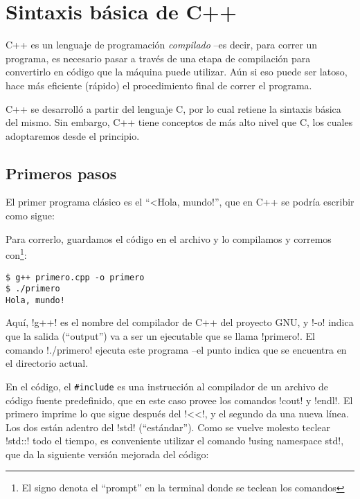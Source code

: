 \chapter{Sintaxis básica de C++}


C++ es un lenguaje de programación \emph{compilado} --es decir, para correr un
programa, es necesario pasar a través de una etapa de compilación para
convertirlo en código que la máquina puede utilizar. Aún si eso puede ser
latoso, hace más eficiente (rápido) el procedimiento final de correr el
programa. 

C++ se desarrolló a partir del lenguaje C, por lo cual retiene la sintaxis
básica del mismo. Sin embargo, C++ tiene conceptos de más alto nivel que C, 
los cuales
adoptaremos  desde el principio.

% 

\section{Primeros pasos}
El primer programa clásico es el ``<Hola, mundo!'', que en C++ se podría
escribir como sigue:

Para correrlo, guardamos el código en el archivo  y lo
compilamos y corremos con\footnote{El signo \inl{\$} denota el ``prompt''
en la terminal donde se teclean los comandos}:
\begin{lstlisting}
$ g++ primero.cpp -o primero
$ ./primero
Hola, mundo!
\end{lstlisting}

Aquí, \inl!g++! es el nombre del compilador de C++ del proyecto GNU, y \inl!-o!
indica que la salida (``output'') va a ser un ejecutable que se llama
\inl!primero!. El comando \inl!./primero! ejecuta este programa --el punto
indica que se encuentra en el directorio actual.

En el código, el \lstinline!#include! es una instrucción al compilador de
 un archivo de código fuente predefinido, que en este caso provee
los comandos \inl!cout! y \inl!endl!. El primero imprime lo que sigue después
del \inl!<<!, y el segundo da una nueva línea.  Los dos están adentro del
 \inl!std!  (``estándar''). Como se vuelve molesto
teclear \inl!std::! todo el tiempo, es conveniente utilizar el comando
\inl!using namespace std!, que da la siguiente versión mejorada del código:


